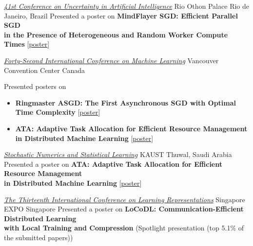 \documentclass[10pt,a4paper,sans]{moderncv}        %
\newcommand{\red}{\color{cherry}}
\newcommand{\kaust}{KAUST}
\newcommand{\thuwal}{Thuwal, Saudi Arabia}
\newcommand{\highlight}[1]{{\red #1}}
\begin{document}
    {\textcolor{accent}{\href{https://www.auai.org/uai2025/}{\textit{41st Conference on Uncertainty in Artificial Intelligence}}}}
    {Rio Othon Palace}
    {Rio de Janeiro, Brazil}
    {}
    {
      Presented a poster on \textbf{MindFlayer SGD: Efficient Parallel SGD \\ in the Presence of Heterogeneous and Random Worker Compute Times} [{\href{https://artomaranjyan.github.io/assets/pdf/posters/MindFlayer_UAI.pdf}{poster}}]
    }

    {\textcolor{accent}{\href{https://icml.cc/Conferences/2025}{\textit{Forty-Second International Conference on Machine Learning}}}}
    {Vancouver Convention Center}
    {Canada}
    {}{
      Presented posters on
      \begin{itemize}
        \item \textbf{Ringmaster ASGD: The First Asynchronous SGD with Optimal Time Complexity} [{\href{https://artomaranjyan.github.io/assets/pdf/posters/Ringmaster_ICML.pdf}{poster}}]
        \item \textbf{ATA: Adaptive Task Allocation for Efficient Resource Management \\ in Distributed Machine Learning} [{\href{https://artomaranjyan.github.io/assets/pdf/posters/ATA_ICML.pdf}{poster}}]
      \end{itemize}
    }

    {\textcolor{accent}{\href{https://cemse.kaust.edu.sa/events/by-type/workshop/2025/05/18/stochastic-numerics-and-statistical-learning-theory-and}{\textit{Stochastic Numerics and Statistical Learning}}}}
    {\kaust}
    {\thuwal}
    {}
    {
      Presented a poster on \textbf{ATA: Adaptive Task Allocation for Efficient Resource Management \\ in Distributed Machine Learning} [{\href{https://artomaranjyan.github.io/assets/pdf/posters/ATA_SNSL.pdf}{poster}}]
    }

  {\textcolor{accent}{\href{https://iclr.cc/virtual/2025/poster/29728}{\textit{The Thirteenth International Conference on Learning Representations}}}}
  {Singapore EXPO}
  {Singapore}
  {}
  {
    Presented a poster on
    \textbf{LoCoDL: Communication-Efficient Distributed Learning \\ with Local Training and Compression} 
    (\highlight{Spotlight presentation (top 5.1\% of the submitted papers)}) 
  }
\end{document}
